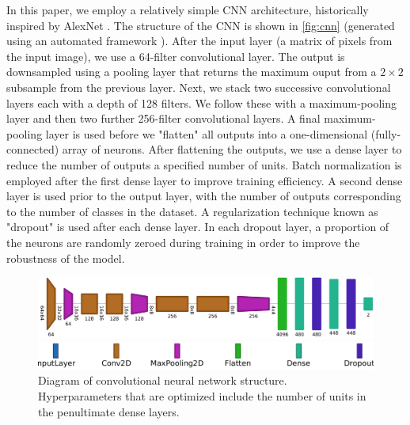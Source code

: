 \documentclass[Journal,letterpaper, SingleSpace, InsideFigs]{ascelike-new}
\begin{document}
In this paper, we employ a relatively simple CNN architecture, historically inspired by AlexNet \cite{krizhevsky2012imageneta}.
The structure of the CNN is shown in \autoref{fig:cnn} (generated using an automated  framework \cite{bauerle2021net2vis}).
After the input layer (a matrix of pixels from the input image), we use a 64-filter convolutional layer.
The output is downsampled using a pooling layer that returns the maximum ouput from a $2\times 2$ subsample from the previous layer.
Next, we stack two successive convolutional layers each with a depth of 128 filters.
We follow these with a maximum-pooling layer and then two further 256-filter convolutional layers.
A final maximum-pooling layer is used before we "flatten" all outputs into a one-dimensional (fully-connected) array of neurons. 
After flattening the outputs, we use a dense layer to reduce the number of outputs a specified number of units.
Batch normalization \cite{ioffe2015batch} is employed after the first dense layer to improve training efficiency.
A second dense layer is used prior to the output layer, with the number of outputs corresponding to the number of classes in the dataset.
A regularization technique known as "dropout" is used after each dense layer.
In each dropout layer, a proportion of the neurons are randomly zeroed during training in order to improve the robustness of the model.
\begin{figure}
    \centering
    \includegraphics[width=.9\textwidth]{net2vis/graph.pdf}
    
    \medskip
    
    \includegraphics[width=.7\textwidth]{figures/net2vis-name-labels/legend}
    \caption{Diagram of convolutional neural network structure. Hyperparameters that are optimized include the number of units in the penultimate dense layers.}
    \label{fig:cnn}
\end{figure}
\end{document}
